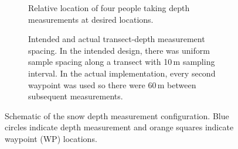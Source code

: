 \documentclass{sfuthesis}
\begin{document}
\begin{figure}[H]
    \centering
    \begin{subfigure}[b]{0.8\textwidth}
        \caption{Relative location of four people taking depth measurements at desired locations.}
        \label{probing:people}
    \end{subfigure}
    
    \begin{subfigure}[b]{0.8\textwidth}
        \caption{Intended and actual transect-depth measurement spacing. In the intended design, there was uniform sample spacing along a transect with 10\,m sampling interval. In the actual implementation, every second waypoint was used so there were 60\,m between subsequent measurements.}
        \label{probing:mapview}
    \end{subfigure}

    \caption{Schematic of the snow depth measurement configuration. Blue circles indicate depth measurement and orange squares indicate waypoint (WP) locations.}\label{probing}
\end{figure}
\end{document}
